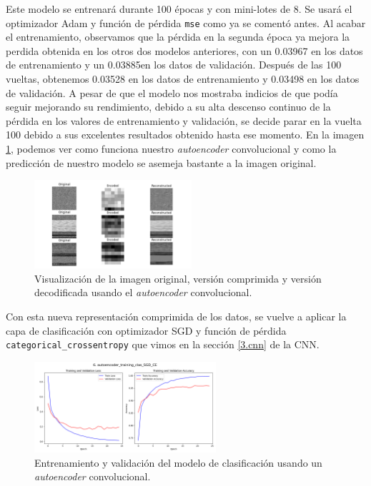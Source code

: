 Este modelo se entrenará durante 100 épocas y con mini-lotes de 8. Se usará el optimizador Adam y función de pérdida \lstinline|mse| como ya se comentó antes. Al acabar el entrenamiento, observamos que la pérdida en la segunda época ya mejora la perdida obtenida en los otros dos modelos anteriores, con un 0.03967 en los datos de entrenamiento y un 0.03885en los datos de validación. Después de las 100 vueltas, obtenemos 0.03528 en los datos de entrenamiento y 0.03498 en los datos de validación. A pesar de que el modelo nos mostraba indicios de que podía seguir mejorando su rendimiento, debido a su alta descenso continuo de la pérdida en los valores de entrenamiento y validación, se decide parar en la vuelta 100 debido a sus excelentes resultados obtenido hasta ese momento. En la imagen \ref{img: reprComprimMMC}, podemos ver como funciona nuestro \textit{autoencoder} convolucional y como la predicción de nuestro modelo se asemeja bastante a la imagen original. 
\begin{figure}[h]
    \begin{center}
    \includegraphics[width=0.52\textwidth]{img/reprComprimMMC.png}
    \end{center}
    \caption{Visualización de la imagen original, versión comprimida y versión decodificada usando el \textit{autoencoder} convolucional.}
    \label{img: reprComprimMMC}
\end{figure}

\bigskip

Con esta nueva representación comprimida de los datos, se vuelve a aplicar la capa de clasificación con optimizador SGD y función de pérdida \lstinline|categorical_crossentropy| que vimos en la sección \ref{3.cnn} de la CNN.

\begin{figure}[H]
    \centering
    \includegraphics[width=0.6\textwidth]{img/caeMMC_sgd_ce.png}
    \caption{Entrenamiento y validación del modelo de clasificación usando un \textit{autoencoder} convolucional.}
    \label{fig:resultados_cae}
\end{figure}

